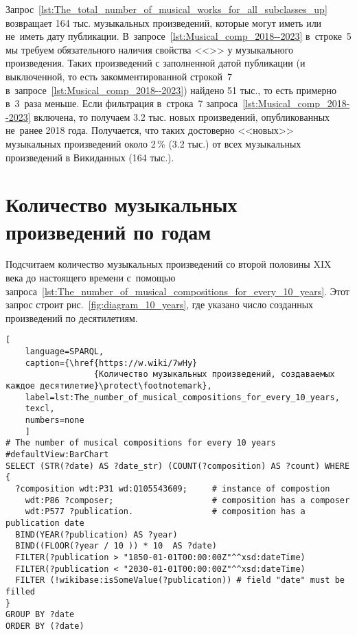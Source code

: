 Запрос~\ref{lst:The_total_number_of_musical_works_for_all_subclasses_up} 
возвращает 164 тыс. музыкальных произведений, которые могут иметь или не~иметь дату публикации. 
В~запросе~\ref{lst:Musical_comp_2018--2023} в~строке~5 
мы требуем обязательного наличия свойства <<>> у музыкального произведения.
Таких произведений с заполненной датой публикации 
(и выключенной, 
 то есть закомментированной строкой~7 в~запросе~\ref{lst:Musical_comp_2018--2023}) найдено 51 тыс., 
то есть примерно в~3~раза меньше. 
Если фильтрация в~строка~7 запроса~\ref{lst:Musical_comp_2018--2023} включена, 
то получаем 3.2 тыс. новых произведений, опубликованных не~ранее 2018 года. 
Получается, что таких достоверно <<новых>> музыкальных произведений 
около 2\,\% (3.2 тыс.) от всех музыкальных произведений в Викиданных (164 тыс.).






\section{Количество музыкальных произведений по годам}

Подсчитаем количество музыкальных произведений 
со второй половины XIX века до настоящего времени 
с~помощью запроса~\ref{lst:The_number_of_musical_compositions_for_every_10_years}. 
Этот запрос строит рис.~\ref{fig:diagram_10_years}, где 
указано число созданных произведений по десятилетиям. 


\begin{lstlisting}[ 
    language=SPARQL,
    caption={\href{https://w.wiki/7wHy}
                  {Количество музыкальных произведений, создаваемых каждое десятилетие}\protect\footnotemark},
    label=lst:The_number_of_musical_compositions_for_every_10_years,
    texcl,
    numbers=none
    ]
# The number of musical compositions for every 10 years
#defaultView:BarChart
SELECT (STR(?date) AS ?date_str) (COUNT(?composition) AS ?count) WHERE {
  ?composition wdt:P31 wd:Q105543609;     # instance of compostion
    wdt:P86 ?composer;                    # composition has a composer
    wdt:P577 ?publication.                # composition has a publication date
  BIND(YEAR(?publication) AS ?year)
  BIND((FLOOR(?year / 10 )) * 10  AS ?date)
  FILTER(?publication > "1850-01-01T00:00:00Z"^^xsd:dateTime)
  FILTER(?publication < "2030-01-01T00:00:00Z"^^xsd:dateTime) 
  FILTER (!wikibase:isSomeValue(?publication)) # field "date" must be filled
}
GROUP BY ?date
ORDER BY (?date)
\end{lstlisting}%

